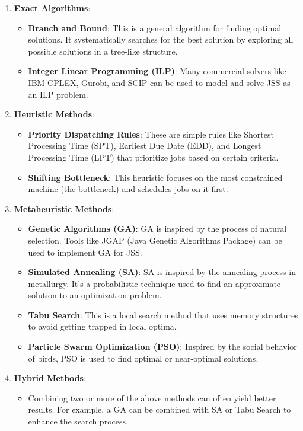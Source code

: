 \begin{enumerate}
    \item \textbf{Exact Algorithms}:
    \begin{itemize}
        \item \textbf{Branch and Bound}: This is a general algorithm for finding optimal solutions. It systematically searches for the best solution by exploring all possible solutions in a tree-like structure.
        \item \textbf{Integer Linear Programming (ILP)}: Many commercial solvers like IBM CPLEX, Gurobi, and SCIP can be used to model and solve JSS as an ILP problem.
    \end{itemize}

    \item \textbf{Heuristic Methods}:
    \begin{itemize}
        \item \textbf{Priority Dispatching Rules}: These are simple rules like Shortest Processing Time (SPT), Earliest Due Date (EDD), and Longest Processing Time (LPT) that prioritize jobs based on certain criteria.
        \item \textbf{Shifting Bottleneck}: This heuristic focuses on the most constrained machine (the bottleneck) and schedules jobs on it first.
    \end{itemize}

    \item \textbf{Metaheuristic Methods}:
    \begin{itemize}
        \item \textbf{Genetic Algorithms (GA)}: GA is inspired by the process of natural selection. Tools like JGAP (Java Genetic Algorithms Package) can be used to implement GA for JSS.
        \item \textbf{Simulated Annealing (SA)}: SA is inspired by the annealing process in metallurgy. It's a probabilistic technique used to find an approximate solution to an optimization problem.
        \item \textbf{Tabu Search}: This is a local search method that uses memory structures to avoid getting trapped in local optima.
        \item \textbf{Particle Swarm Optimization (PSO)}: Inspired by the social behavior of birds, PSO is used to find optimal or near-optimal solutions.
    \end{itemize}

    \item \textbf{Hybrid Methods}:
    \begin{itemize}
        \item Combining two or more of the above methods can often yield better results. For example, a GA can be combined with SA or Tabu Search to enhance the search process.
    \end{itemize}


\end{enumerate}
